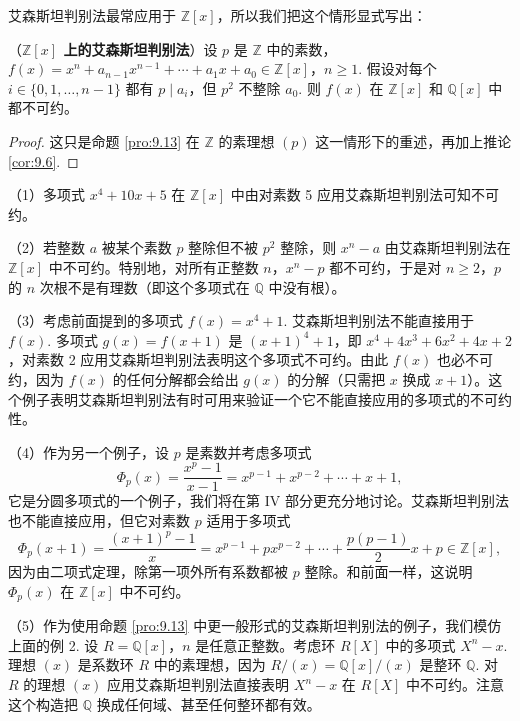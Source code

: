 艾森斯坦判别法最常应用于 \(\mathbb{Z}[x]\)，所以我们把这个情形显式写出：

\begin{corollary}\label{cor:9.14}
（\textbf{\(\mathbb{Z}[x]\) 上的艾森斯坦判别法}）设 \(p\) 是 \(\mathbb{Z}\) 中的素数，\(f(x) = x^n + a_{n-1}x^{n-1} + \cdots + a_1x + a_0 \in \mathbb{Z}[x]\)，\(n \geq 1\). 假设对每个 \(i \in \{0, 1, \ldots, n-1\}\) 都有 \(p \mid a_i\)，但 \(p^2\) 不整除 \(a_0\). 则 \(f(x)\) 在 \(\mathbb{Z}[x]\) 和 \(\mathbb{Q}[x]\) 中都不可约。
\end{corollary}

\begin{proof}
这只是命题 \ref{pro:9.13} 在 \(\mathbb{Z}\) 的素理想 \((p)\) 这一情形下的重述，再加上推论 \ref{cor:9.6}.
\end{proof}

\begin{example}
（1）多项式 \(x^4+10x+5\) 在 \(\mathbb{Z}[x]\) 中由对素数 5 应用艾森斯坦判别法可知不可约。

（2）若整数 \(a\) 被某个素数 \(p\) 整除但不被 \(p^2\) 整除，则 \(x^n-a\) 由艾森斯坦判别法在 \(\mathbb{Z}[x]\) 中不可约。特别地，对所有正整数 \(n\)，\(x^n-p\) 都不可约，于是对 \(n \geq 2\)，\(p\) 的 \(n\) 次根不是有理数（即这个多项式在 \(\mathbb{Q}\) 中没有根）。

（3）考虑前面提到的多项式 \(f(x) = x^4+1\). 艾森斯坦判别法不能直接用于 \(f(x)\). 多项式 \(g(x) = f(x+1)\) 是 \((x+1)^4+1\)，即 \(x^4+4x^3+6x^2+4x+2\)，对素数 2 应用艾森斯坦判别法表明这个多项式不可约。由此 \(f(x)\) 也必不可约，因为 \(f(x)\) 的任何分解都会给出 \(g(x)\) 的分解（只需把 \(x\) 换成 \(x+1\)）。这个例子表明艾森斯坦判别法有时可用来验证一个它不能直接应用的多项式的不可约性。

（4）作为另一个例子，设 \(p\) 是素数并考虑多项式
\[
\Phi_p(x) = \frac{x^p-1}{x-1} = x^{p-1} + x^{p-2} + \cdots + x + 1,
\]
它是分圆多项式的一个例子，我们将在第 IV 部分更充分地讨论。艾森斯坦判别法也不能直接应用，但它对素数 \(p\) 适用于多项式
\[
\Phi_p(x+1) = \frac{(x+1)^p-1}{x} = x^{p-1} + px^{p-2} + \cdots + \frac{p(p-1)}{2}x + p \in \mathbb{Z}[x],
\]
因为由二项式定理，除第一项外所有系数都被 \(p\) 整除。和前面一样，这说明 \(\Phi_p(x)\) 在 \(\mathbb{Z}[x]\) 中不可约。

（5）作为使用命题 \ref{pro:9.13} 中更一般形式的艾森斯坦判别法的例子，我们模仿上面的例 2. 设 \(R = \mathbb{Q}[x]\)，\(n\) 是任意正整数。考虑环 \(R[X]\) 中的多项式 \(X^n-x\). 理想 \((x)\) 是系数环 \(R\) 中的素理想，因为 \(R/(x) = \mathbb{Q}[x]/(x)\) 是整环 \(\mathbb{Q}\). 对 \(R\) 的理想 \((x)\) 应用艾森斯坦判别法直接表明 \(X^n-x\) 在 \(R[X]\) 中不可约。注意这个构造把 \(\mathbb{Q}\) 换成任何域、甚至任何整环都有效。
\end{example}

